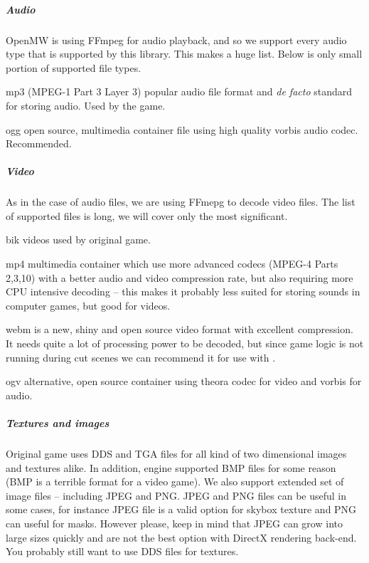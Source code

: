 \subparagraph{Audio}
OpenMW is using {FFmpeg} for audio playback, and so we support every audio type that is supported by this library. This makes a huge list. Below is only small portion of supported file types.

\begin{description}
 \item mp3 ({MPEG}-1 {Part 3 Layer 3}) popular audio file format and \textit{de facto} standard for storing audio. Used by the \MW{} game.
 \item ogg open source, multimedia container file using high quality vorbis audio codec. Recommended.
\end{description}

\subparagraph{Video}
As in the case of audio files, we are using {FFmepg} to decode video files. The list of supported files is long, we will cover
only the most significant.

\begin{description}
 \item bik videos used by original \MW{} game.
 \item mp4 multimedia container which use more advanced codecs ({MPEG-4 Parts 2,3,10}) with a better audio and video compression rate,
 but also requiring more {CPU} intensive decoding -- this makes it probably less suited for storing sounds in computer games, but good for videos.
 \item webm is a new, shiny and open source video format with excellent compression. It needs quite a lot of processing power to be decoded,
 but since game logic is not running during cut scenes we can recommend it for use with \OMW.
 \item ogv alternative, open source container using theora codec for video and vorbis for audio.
\end{description}

\subparagraph{Textures and images}
Original \MW{} game uses {DDS} and {TGA} files for all kind of two dimensional images and textures alike. In addition, engine supported BMP
files for some reason ({BMP} is a terrible format for a video game). We also support extended set of image files -- including {JPEG} and {PNG}.
JPEG and PNG files can be useful in some cases, for instance JPEG file is a valid option for skybox texture and PNG can useful for masks.
However please, keep in mind that JPEG can grow into large sizes quickly and are not the best option with {DirectX} rendering back-end. You probably still want to use {DDS} files for textures.

